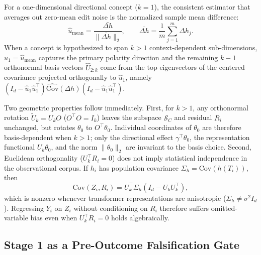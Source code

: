 \documentclass[11pt]{article}
\begin{document}
For a one-dimensional directional concept ($k = 1$), the consistent estimator that averages out zero-mean edit noise is the normalized sample mean difference:
\begin{equation}\label{eq:u_mean}
\hat{u}_{\mathrm{mean}} = \frac{\bar{\Delta h}}{\|\bar{\Delta h}\|_2}, \qquad \bar{\Delta h} = \frac{1}{m}\sum_{j=1}^m \Delta h_j.
\end{equation}
When a concept is hypothesized to span $k > 1$ context-dependent sub-dimensions, $\hat{u}_1 = \hat{u}_{\mathrm{mean}}$ captures the primary polarity direction and the remaining $k-1$ orthonormal basis vectors $\hat{U}_{2:k}$ come from the top eigenvectors of the centered covariance projected orthogonally to $\hat{u}_1$, namely $(I_d - \hat{u}_1\hat{u}_1^\top)\widehat{\mathrm{Cov}}(\Delta h)(I_d - \hat{u}_1\hat{u}_1^\top)$.

Two geometric properties follow immediately. First, for $k > 1$, any orthonormal rotation $\tilde{U}_k = U_k O$ ($O^\top O = I_k$) leaves the subspace $\mathcal{S}_C$ and residual $R_i$ unchanged, but rotates $\theta_0$ to $O^\top \theta_0$. Individual coordinates of $\theta_0$ are therefore basis-dependent when $k > 1$; only the directional effect $\gamma^\top \theta_0$, the representation functional $U_k \theta_0$, and the norm $\|\theta_0\|_2$ are invariant to the basis choice. Second, Euclidean orthogonality ($U_k^\top R_i = 0$) does not imply statistical independence in the observational corpus. If $h_i$ has population covariance $\Sigma_h = \mathrm{Cov}(h(T_i))$, then
\begin{equation}\label{eq:cov_zr}
\mathrm{Cov}(Z_i, R_i) = U_k^\top \Sigma_h (I_d - U_k U_k^\top),
\end{equation}
which is nonzero whenever transformer representations are anisotropic ($\Sigma_h \neq \sigma^2 I_d$). Regressing $Y_i$ on $Z_i$ without conditioning on $R_i$ therefore suffers omitted-variable bias even when $U_k^\top R_i = 0$ holds algebraically.

\subsection{Stage 1 as a Pre-Outcome Falsification Gate}
\end{document}
